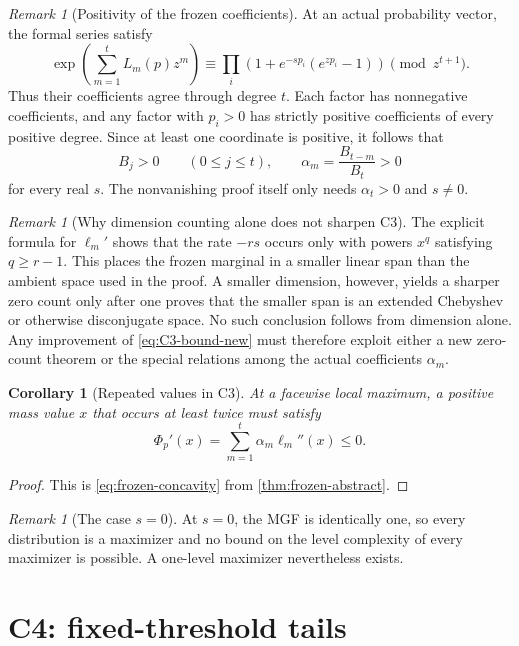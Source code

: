 \documentclass[11pt]{article}
\theoremstyle{plain}
\newtheorem{corollary}[theorem]{Corollary}
\theoremstyle{definition}
\theoremstyle{remark}
\newtheorem{remark}[theorem]{Remark}
\begin{document}
\begin{remark}[Positivity of the frozen coefficients]
At an actual probability vector, the formal series satisfy
\[
\exp\left(\sum_{m=1}^tL_m(p)z^m\right)
\equiv\prod_i\left(1+e^{-sp_i}(e^{zp_i}-1)\right)
\pmod {z^{t+1}}.
\]
Thus their coefficients agree through degree \(t\).
Each factor has nonnegative coefficients, and any factor with \(p_i>0\) has strictly positive coefficients of every positive degree.  Since at least one coordinate is positive, it follows that
\[
B_j>0
\qquad(0\le j\le t),
\qquad
\alpha_m=\frac{B_{t-m}}{B_t}>0
\]
for every real \(s\).  The nonvanishing proof itself only needs \(\alpha_t>0\) and \(s\ne0\).
\end{remark}

\begin{remark}[Why dimension counting alone does not sharpen C3]
The explicit formula for \(\ell_m'\) shows that the rate \(-rs\) occurs only with powers \(x^q\) satisfying \(q\ge r-1\).  This places the frozen marginal in a smaller linear span than the ambient space used in the proof.  A smaller dimension, however, yields a sharper zero count only after one proves that the smaller span is an extended Chebyshev or otherwise disconjugate space.  No such conclusion follows from dimension alone.  Any improvement of \eqref{eq:C3-bound-new} must therefore exploit either a new zero-count theorem or the special relations among the actual coefficients \(\alpha_m\).
\end{remark}

\begin{corollary}[Repeated values in C3]\label{cor:C3-repeated}
At a facewise local maximum, a positive mass value \(x\) that occurs at least twice must satisfy
\[
\Phi_p'(x)=\sum_{m=1}^t\alpha_m\ell_m''(x)\le0.
\]
\end{corollary}

\begin{proof}
This is \eqref{eq:frozen-concavity} from \cref{thm:frozen-abstract}.
\end{proof}

\begin{remark}[The case \(s=0\)]
At \(s=0\), the MGF is identically one, so every distribution is a maximizer and no bound on the level complexity of every maximizer is possible.  A one-level maximizer nevertheless exists.
\end{remark}

\section{C4: fixed-threshold tails}
\end{document}
